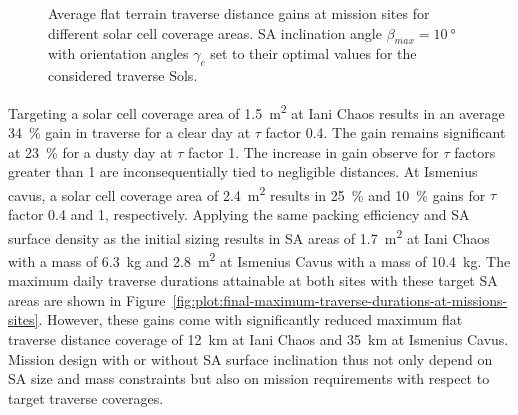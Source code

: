 \documentclass[twocolumn,letterpaper]{IEEEAerospaceCLS}  %
\newcommand{\refFig}[1]{{Figure}~\ref{#1}} %
\newlength{\subfigureWidth}
\begin{document}
\begin{figure}[h]
\begin{subfigure}[t]{\subfigureWidth}
    \label{fig:plot:sub:iani-chaos-flat-traverse-gains-for-different-sa-area}
    \end{subfigure}
    \caption{Average flat terrain traverse distance gains at mission sites for different solar cell coverage areas. \ac{SA} inclination angle $\beta_{max} = \SI{10}{\degree}$ with orientation angles $\gamma_{c}$ set to their optimal values for the considered traverse Sols.}
    \label{fig:plot:flat-traverse-gains-for-different-sa-area}
\end{figure}

Targeting a solar cell coverage area of \SI{1.5}{m^{2}} at Iani Chaos results in an average \SI{34}{\percent} gain in traverse for a clear day at $\tau$ factor 0.4. The gain remains significant at \SI{23}{\percent} for a dusty day at $\tau$ factor 1. The increase in gain observe for $\tau$ factors greater than 1 are inconsequentially tied to negligible distances. At Ismenius cavus, a solar cell coverage area of \SI{2.4}{m^{2}} results in \SI{25}{\percent} and \SI{10}{\percent} gains for $\tau$ factor 0.4 and 1, respectively. Applying the same packing efficiency and \ac{SA} surface density as the initial sizing results in \ac{SA} areas of \SI{1.7}{m^{2}} at Iani Chaos with a mass of \SI{6.3}{\kilo\gram} and \SI{2.8}{m^{2}} at Ismenius Cavus with a mass of \SI{10.4}{\kilo\gram}. The maximum daily traverse durations attainable at both sites with these target \ac{SA} areas are shown in \refFig{fig:plot:final-maximum-traverse-durations-at-missions-sites}. However, these gains come with significantly reduced maximum flat traverse distance coverage of \SI{12}{\kilo\meter} at Iani Chaos and \SI{35}{\kilo\meter} at Ismenius Cavus. Mission design with or without \ac{SA} surface inclination thus not only depend on \ac{SA} size and mass constraints but also on mission requirements with respect to target traverse coverages.
\end{document}
